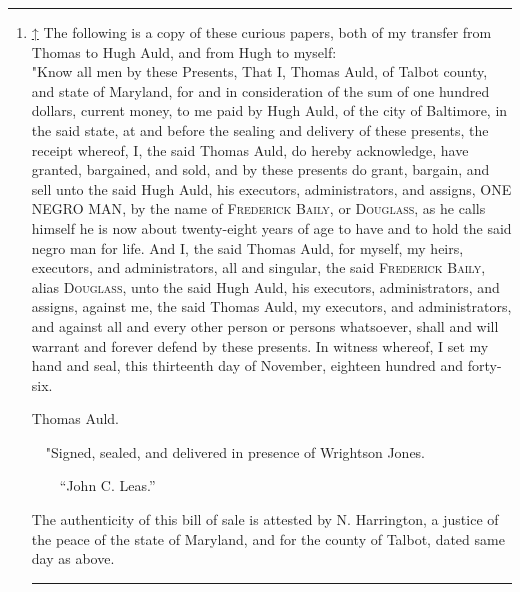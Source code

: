 \begin{center}\rule{0.5\linewidth}{\linethickness}\end{center}

\begin{enumerate}
\item
  \hypertarget{cite_note-p374-1}{}

  {\protect\hyperlink{cite_ref-p374_1-0}{↑}} {The following is a copy of
  these curious papers, both of my transfer from Thomas to Hugh Auld,
  and from Hugh to myself:\\[2\baselineskip]"Know all men by these
  Presents, That I, Thomas Auld, of Talbot county, and state of
  Maryland, for and in consideration of the sum of one hundred dollars,
  current money, to me paid by Hugh Auld, of the city of Baltimore, in
  the said state, at and before the sealing and delivery of these
  presents, the receipt whereof, I, the said Thomas Auld, do hereby
  acknowledge, have granted, bargained, and sold, and by these presents
  do grant, bargain, and sell unto the said Hugh Auld, his executors,
  administrators, and assigns, {ONE NEGRO MAN}, by the name of
  \textsc{Frederick Baily}, or \textsc{Douglass}, as he calls himself he
  is now about twenty-eight years of age to have and to hold the said
  negro man for life. And I, the said Thomas Auld, for myself, my heirs,
  executors, and administrators, all and singular, the said
  \textsc{Frederick Baily}, alias \textsc{Douglass}, unto the said Hugh
  Auld, his executors, administrators, and assigns, against me, the said
  Thomas Auld, my executors, and administrators, and against all and
  every other person or persons whatsoever, shall and will warrant and
  forever defend by these presents. In witness whereof, I set my hand
  and seal, this thirteenth day of November, eighteen hundred and
  forty-six.}

  Thomas Auld. 

   "Signed, sealed, and delivered in presence of Wrightson Jones.

    ``John C. Leas.''

  The authenticity of this bill of sale is attested by N. Harrington, a
  justice of the peace of the state of Maryland, and for the county of
  Talbot, dated same day as above.

  \begin{center}\rule{0.5\linewidth}{\linethickness}\end{center}


\end{enumerate}
